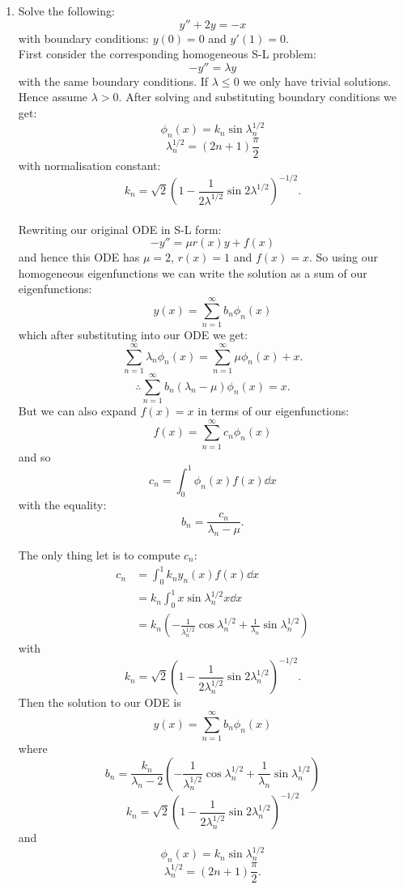 \begin{enumerate}
    \newpage

    \item Solve the following:
    $$y''+2y=-x$$
    with boundary conditions:
    $y(0)=0$ and $y'(1)=0$. \\

    First consider the corresponding homogeneous S-L problem:
    $$-y''=\lambda y$$
    with the same boundary conditions. If $\lambda\leq0$ we only have trivial solutions.
    Hence assume $\lambda>0$. After solving and substituting boundary conditions we get:
    $$\phi_n(x)=k_n\sin\lambda_n^{1/2}$$
    $$\lambda_n^{1/2}=(2n+1)\frac{\pi}{2}$$
    with normalisation constant:
    $$k_n=\sqrt{2}\left(1-\frac{1}{2\lambda^{1/2}}\sin2\lambda^{1/2}\right)^{-1/2}.$$ \\

    Rewriting our original ODE in S-L form:
    $$-y''=\mu r(x) y+f(x)$$
    and hence this ODE has $\mu=2$, $r(x)=1$ and $f(x)=x$. So using our homogeneous eigenfunctions
    we can write the solution as a sum of our eigenfunctions:
    $$y(x)=\sum_{n=1}^{\infty}b_n\phi_n(x)$$
    which after substituting into our ODE we get:
    $$\sum_{n=1}^{\infty}\lambda_n \phi_n(x)
    =\sum_{n=1}^{\infty}\mu\phi_n(x)+x.$$
    $$\therefore\sum_{n=1}^{\infty}b_n(\lambda_n-\mu)\phi_n(x)=x.$$
    But we can also expand $f(x)=x$ in terms of our eigenfunctions:
    $$f(x)=\sum_{n=1}^{\infty}c_n\phi_n(x)$$
    and so
    $$c_n=\int_{0}^{1}\phi_n(x)f(x)\dd x$$
    with the equality:
    $$b_n=\frac{c_n}{\lambda_n-\mu}.$$
    
    \newpage

    The only thing let is to compute $c_n$:
    \begin{align*}
        c_n
        &=\int_{0}^{1}k_n y_n(x)f(x)\dd x \\
        &=k_n\int_{0}^{1}x\sin\lambda_n^{1/2}x\dd x \\
        &=k_n\left(-\frac{1}{\lambda_n^{1/2}}\cos\lambda_n^{1/2}
        +\frac{1}{\lambda_n}\sin\lambda_n^{1/2}\right)
    \end{align*}
    with
    $$k_n=\sqrt{2}\left(1-\frac{1}{2\lambda_n^{1/2}}\sin2\lambda_n^{1/2}\right)^{-1/2}.$$
    Then the solution to our ODE is
    $$y(x)=\sum_{n=1}^{\infty}b_n\phi_n(x)$$
    where
    $$b_n=\frac{k_n}{\lambda_n-2}\left(-\frac{1}{\lambda_n^{1/2}}\cos\lambda_n^{1/2}
    +\frac{1}{\lambda_n}\sin\lambda_n^{1/2}\right)$$
    $$k_n=\sqrt{2}\left(1-\frac{1}{2\lambda_n^{1/2}}\sin2\lambda_n^{1/2}\right)^{-1/2}$$
    and
    $$\phi_n(x)=k_n\sin\lambda_n^{1/2}$$
    $$\lambda_n^{1/2}=(2n+1)\frac{\pi}{2}.$$
\end{enumerate}
